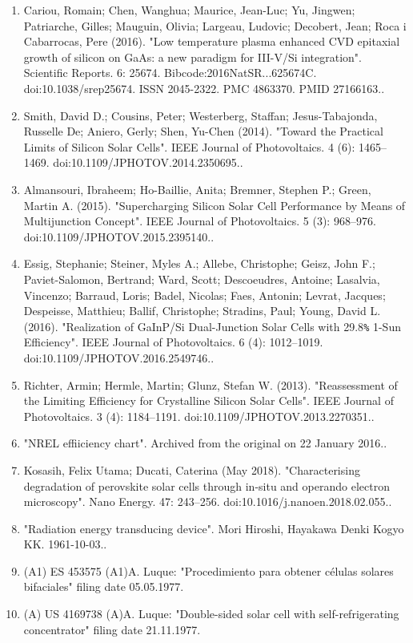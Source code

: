 \begin{enumerate}
\item Cariou, Romain; Chen, Wanghua; Maurice, Jean-Luc; Yu, Jingwen; Patriarche, Gilles; Mauguin, Olivia; Largeau, Ludovic; Decobert, Jean; Roca i Cabarrocas, Pere (2016). "Low temperature plasma enhanced CVD epitaxial growth of silicon on GaAs: a new paradigm for III-V/Si integration". Scientific Reports. 6: 25674. Bibcode:2016NatSR...625674C. doi:10.1038/srep25674. ISSN 2045-2322. PMC 4863370. PMID 27166163..
\item Smith, David D.; Cousins, Peter; Westerberg, Staffan; Jesus-Tabajonda, Russelle De; Aniero, Gerly; Shen, Yu-Chen (2014). "Toward the Practical Limits of Silicon Solar Cells". IEEE Journal of Photovoltaics. 4 (6): 1465–1469. doi:10.1109/JPHOTOV.2014.2350695..
\item Almansouri, Ibraheem; Ho-Baillie, Anita; Bremner, Stephen P.; Green, Martin A. (2015). "Supercharging Silicon Solar Cell Performance by Means of Multijunction Concept". IEEE Journal of Photovoltaics. 5 (3): 968–976. doi:10.1109/JPHOTOV.2015.2395140..
\item Essig, Stephanie; Steiner, Myles A.; Allebe, Christophe; Geisz, John F.; Paviet-Salomon, Bertrand; Ward, Scott; Descoeudres, Antoine; Lasalvia, Vincenzo; Barraud, Loris; Badel, Nicolas; Faes, Antonin; Levrat, Jacques; Despeisse, Matthieu; Ballif, Christophe; Stradins, Paul; Young, David L. (2016). "Realization of GaInP/Si Dual-Junction Solar Cells with 29.8\verb|%| 1-Sun Efficiency". IEEE Journal of Photovoltaics. 6 (4): 1012–1019. doi:10.1109/JPHOTOV.2016.2549746..
\item Richter, Armin; Hermle, Martin; Glunz, Stefan W. (2013). "Reassessment of the Limiting Efficiency for Crystalline Silicon Solar Cells". IEEE Journal of Photovoltaics. 3 (4): 1184–1191. doi:10.1109/JPHOTOV.2013.2270351..
\item "NREL effiiciency chart". Archived from the original on 22 January 2016..
\item Kosasih, Felix Utama; Ducati, Caterina (May 2018). "Characterising degradation of perovskite solar cells through in-situ and operando electron microscopy". Nano Energy. 47: 243–256. doi:10.1016/j.nanoen.2018.02.055..
\item "Radiation energy transducing device". Mori Hiroshi, Hayakawa Denki Kogyo KK. 1961-10-03..
\item (A1) ES 453575 (A1)A. Luque: "Procedimiento para obtener células solares bifaciales" filing date 05.05.1977.
\item (A) US 4169738 (A)A. Luque: "Double-sided solar cell with self-refrigerating concentrator" filing date 21.11.1977.

\end{enumerate}
